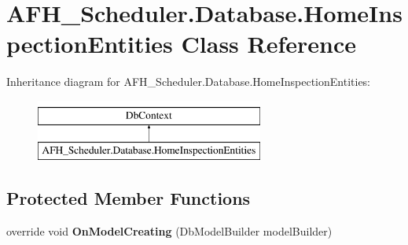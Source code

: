 \section{A\+F\+H\+\_\+\+Scheduler.\+Database.\+Home\+Inspection\+Entities Class Reference}
\label{class_a_f_h___scheduler_1_1_database_1_1_home_inspection_entities}
Inheritance diagram for A\+F\+H\+\_\+\+Scheduler.\+Database.\+Home\+Inspection\+Entities\+:\begin{figure}[H]
\begin{center}
\leavevmode
\includegraphics[height=2.000000cm]{class_a_f_h___scheduler_1_1_database_1_1_home_inspection_entities}
\end{center}
\end{figure}
\subsection*{Protected Member Functions}
\begin{DoxyCompactItemize}
\item 
\mbox{\label{class_a_f_h___scheduler_1_1_database_1_1_home_inspection_entities_aef42fc5f9c1cd5ace6943de0603e811a}} 
override void {\bfseries On\+Model\+Creating} (Db\+Model\+Builder model\+Builder)
\end{DoxyCompactItemize}
